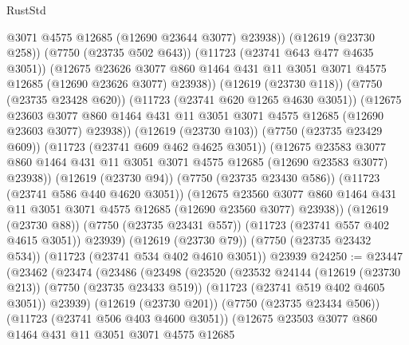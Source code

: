 \begin{lexlean}{RustStd}
\begin{coremodule}
                  @3071
                  @4575
                  @12685
                  (@12690 @23644 @3077)
                  @23938))
              (@12619 (@23730 @258))
              (@7750 (@23735 @502 @643))
              (@11723 (@23741 @643 @477 @4635 @3051))
              (@12675
                @23626
                @3077
                @860
                @1464
                @431
                @11
                @3051
                @3071
                @4575
                @12685
                (@12690 @23626 @3077)
                @23938))
            (@12619 (@23730 @118))
            (@7750 (@23735 @23428 @620))
            (@11723 (@23741 @620 @1265 @4630 @3051))
            (@12675
              @23603
              @3077
              @860
              @1464
              @431
              @11
              @3051
              @3071
              @4575
              @12685
              (@12690 @23603 @3077)
              @23938))
          (@12619 (@23730 @103))
          (@7750 (@23735 @23429 @609))
          (@11723 (@23741 @609 @462 @4625 @3051))
          (@12675
            @23583
            @3077
            @860
            @1464
            @431
            @11
            @3051
            @3071
            @4575
            @12685
            (@12690 @23583 @3077)
            @23938))
        (@12619 (@23730 @94))
        (@7750 (@23735 @23430 @586))
        (@11723 (@23741 @586 @440 @4620 @3051))
        (@12675
          @23560
          @3077
          @860
          @1464
          @431
          @11
          @3051
          @3071
          @4575
          @12685
          (@12690 @23560 @3077)
          @23938))
      (@12619 (@23730 @88))
      (@7750 (@23735 @23431 @557))
      (@11723 (@23741 @557 @402 @4615 @3051))
      @23939)
    (@12619 (@23730 @79))
    (@7750 (@23735 @23432 @534))
    (@11723 (@23741 @534 @402 @4610 @3051))
    @23939
@24250 := @23447
    (@23462
      (@23474
        (@23486
          (@23498
            (@23520
              (@23532
                @24144
                (@12619 (@23730 @213))
                (@7750 (@23735 @23433 @519))
                (@11723 (@23741 @519 @402 @4605 @3051))
                @23939)
              (@12619 (@23730 @201))
              (@7750 (@23735 @23434 @506))
              (@11723 (@23741 @506 @403 @4600 @3051))
              (@12675
                @23503
                @3077
                @860
                @1464
                @431
                @11
                @3051
                @3071
                @4575
                @12685

\end{coremodule}
\end{lexlean}
